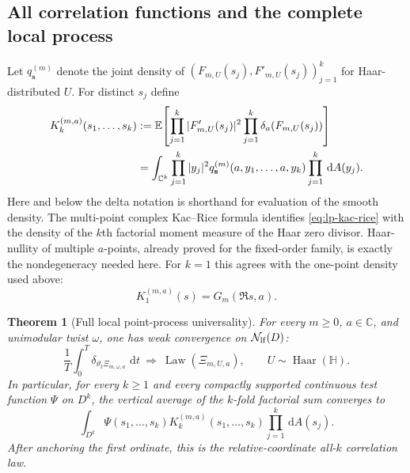 \documentclass[11pt]{article}
\newtheorem{theorem}{Theorem}[section]
\theoremstyle{definition}
\theoremstyle{remark}
\newcommand{\dd}{\,\mathrm d}
\newcommand{\C}{\mathbb C}
\begin{document}
\subsection{All correlation functions and the complete local process}

Let $q^{(m)}_{\mathbf s}$ denote the joint density of
$(F_{m,U}(s_j),F'_{m,U}(s_j))_{j=1}^k$ for Haar-distributed $U$.  For distinct
$s_j$ define
\begin{align}
 K_k^{(m,a)}(s_1,\ldots,s_k)
 &:={\mathbb E}\!\left[
   \prod_{j=1}^k|F'_{m,U}(s_j)|^2
   \prod_{j=1}^k\delta_a(F_{m,U}(s_j))
 \right]                                                     \notag\\
 &=\int_{\C^k}\prod_{j=1}^k|y_j|^2
 q^{(m)}_{\mathbf s}(a,y_1,\ldots,a,y_k)
 \prod_{j=1}^k\dd A(y_j).
 \label{eq:lp-kac-rice}
\end{align}
Here and below the delta notation is shorthand for evaluation of the smooth
density.  The multi-point complex Kac--Rice formula identifies
\eqref{eq:lp-kac-rice} with the density of the $k$th factorial moment measure
of the Haar zero divisor.  Haar-nullity of multiple $a$-points, already proved
for the fixed-order family, is exactly the nondegeneracy needed here.  For
$k=1$ this agrees with the one-point density used above:
\begin{equation}
 K_1^{(m,a)}(s)=G_m(\Re s,a).
 \label{eq:lp-one-point}
\end{equation}

\begin{theorem}[Full local point-process universality]
\label{thm:lp-process}
For every $m\geq0$, $a\in\C$, and unimodular twist $\omega$, one has weak
convergence on $\mathcal N_{\rm lf}(D)$:
\begin{equation}
 \boxed{
 \frac1T\int_0^T\delta_{\vartheta_t\Xi_{m,\omega,a}}\,\dd t
 \ \Longrightarrow\ 
 \operatorname{Law}(\Xi_{m,U,a}),
 \qquad U\sim\operatorname{Haar}(\mathbb H).
 }
 \label{eq:lp-process-limit}
\end{equation}
In particular, for every $k\geq1$ and every compactly supported continuous
test function $\Psi$ on $D^k$, the vertical average of the $k$-fold factorial
sum converges to
\begin{equation}
 \int_{D^k}\Psi(s_1,\ldots,s_k)
 K_k^{(m,a)}(s_1,\ldots,s_k)\prod_{j=1}^k\dd A(s_j).
 \label{eq:lp-factorial-limit}
\end{equation}
After anchoring the first ordinate, this is the relative-coordinate all-$k$
correlation law.
\end{theorem}
\end{document}
